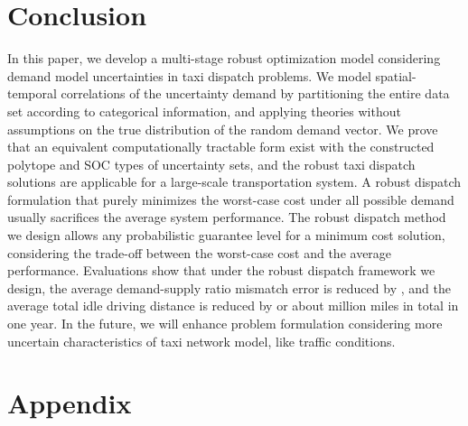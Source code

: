 \documentclass[10pt,twocolumn,twoside,english]{IEEEtran}
\begin{document}
\section{Conclusion}
\label{sec:conclusion}
In this paper, we develop a multi-stage robust optimization model considering demand model uncertainties in taxi dispatch problems. We model spatial-temporal correlations of the uncertainty demand by partitioning the entire data set according to categorical information, and applying theories without assumptions on the true distribution of the random demand vector. We prove that an equivalent computationally tractable form exist with the constructed polytope and SOC types of uncertainty sets, and the robust taxi dispatch solutions are applicable for a large-scale transportation system. A robust dispatch formulation that purely minimizes the worst-case cost under all possible demand usually sacrifices the average system performance. The robust dispatch method we design allows any probabilistic guarantee level for a minimum cost solution, considering the trade-off between the worst-case cost and the average performance. Evaluations show that under the robust dispatch framework we design, the average demand-supply ratio mismatch error is reduced by , and the average total idle driving distance is reduced by  or about  million miles in total in one year. In the future, we will enhance problem formulation considering more uncertain characteristics of taxi network model, like traffic conditions. 


{  \small 

}
\section{Appendix}
\label{appendix}
\end{document}
